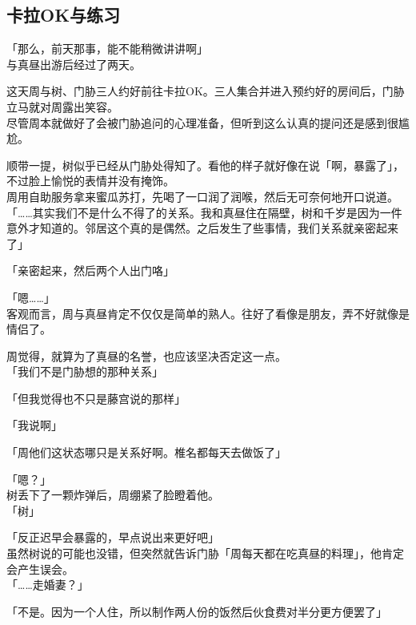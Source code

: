 \subsection{卡拉OK与练习}

「那么，前天那事，能不能稍微讲讲啊」\\

与真昼出游后经过了两天。

这天周与树、门胁三人约好前往卡拉OK。三人集合并进入预约好的房间后，门胁立马就对周露出笑容。\\

尽管周本就做好了会被门胁追问的心理准备，但听到这么认真的提问还是感到很尴尬。

顺带一提，树似乎已经从门胁处得知了。看他的样子就好像在说「啊，暴露了」，不过脸上愉悦的表情并没有掩饰。\\

周用自助服务拿来蜜瓜苏打，先喝了一口润了润喉，然后无可奈何地开口说道。\\

「……其实我们不是什么不得了的关系。我和真昼住在隔壁，树和千岁是因为一件意外才知道的。邻居这个真的是偶然。之后发生了些事情，我们关系就亲密起来了」

「亲密起来，然后两个人出门咯」

「嗯……」\\

客观而言，周与真昼肯定不仅仅是简单的熟人。往好了看像是朋友，弄不好就像是情侣了。

周觉得，就算为了真昼的名誉，也应该坚决否定这一点。\\

「我们不是门胁想的那种关系」

「但我觉得也不只是藤宫说的那样」

「我说啊」

「周他们这状态哪只是关系好啊。椎名都每天去做饭了」

「嗯？」\\

树丢下了一颗炸弹后，周绷紧了脸瞪着他。\\

「树」

「反正迟早会暴露的，早点说出来更好吧」\\

虽然树说的可能也没错，但突然就告诉门胁「周每天都在吃真昼的料理」，他肯定会产生误会。\\

「……走婚妻？」

「不是。因为一个人住，所以制作两人份的饭然后伙食费对半分更方便罢了」

